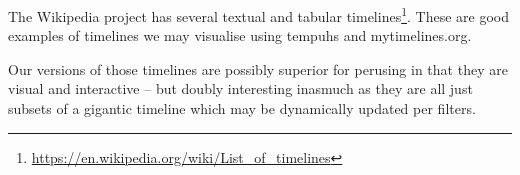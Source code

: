The Wikipedia project has several textual and tabular 
timelines\footnote{\url{https://en.wikipedia.org/wiki/List_of_timelines}}. 
These are good examples of timelines we may visualise using tempuhs and 
mytimelines.org.

Our versions of those timelines are possibly superior for perusing in that 
they are visual and interactive -- but doubly interesting inasmuch as they are 
all just subsets of a gigantic timeline which may be dynamically updated per 
filters.
